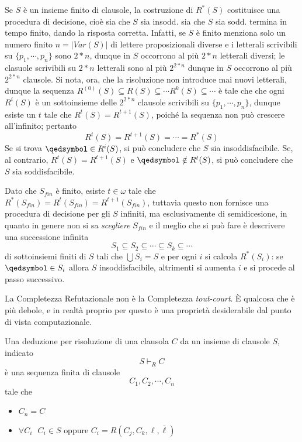 \begin{oss}
        Se $S$ è un insieme finito di clausole, la costruzione di $R^*(S)$ 
        costituisce una procedura di decisione, cioè sia che $S$ sia insodd. 
        sia che $S$ sia sodd. termina in tempo finito, dando la risposta 
        corretta. Infatti, se $S$ è finito menziona solo un numero finito $n = |Var(S)|$ di 
        lettere proposizionali diverse e i letterali scrivibili su $\{p_1, \cdots, p_n\}$ 
        sono $2*n$, dunque in $S$ occorrono al più $2*n$ letterali diversi; le 
        clasuole scrivibili su $2*n$ letterali sono al più $2^{2*n}$ dunque 
        in $S$ occorrono al più $2^{2*n}$ clausole. 
        Si nota, ora, che la risoluzione non introduce mai nuovi letterali, 
        dunque la sequenza $R^{(0)}(S) \subseteq R(S) \subseteq \cdots R^{k}(S) \subseteq \cdots$ 
        è tale che  che ogni $R^{i}(S)$ è un sottoinsieme delle $2^{2*n}$ clausole 
        scrivibili su $\{p_1, \cdots, p_n\}$, dunque esiste un $t$ tale che 
        $R^{t}(S) = R^{t+1}(S)$, poiché la sequenza non può crescere all'infinito; 
        pertanto
        $$
        R^{t}(S) = R^{t+1}(S) = \cdots = R^*(S)
        $$
        Se si trova $\qedsymbol \in R^i(S)$, si può concludere che $S$ sia 
        insoddisfacibile. Se, al contrario, $R^t(S) = R^{t+1}(S)$ e $\qedsymbol \notin R^t(S)$, 
        si può concludere che $S$ sia soddisfacibile. 
\end{oss}
\begin{oss}
        Dato che $S_{fin}$ è finito, esiste $t \in \omega$ tale 
        che $R^*(S_{fin})=R^t(S_{fin}) = R^{t+1}(S_{fin})$, 
        tuttavia questo non fornisce una procedura di decisione per 
        gli $S$ infiniti, ma esclusivamente di semidicesione, in quanto 
        in genere non si sa \textit{scegliere} $S_{fin}$ e 
        il meglio che si può fare è descrivere una successione infinita 
        $$
        S_1 \subseteq S_2 \subseteq \cdots \subseteq S_k  \subseteq \cdots 
        $$
        di sottoinsiemi finiti di $S$ tali che $\bigcup S_i = S$ e 
        per ogni $i$ si calcola $R^*(S_i)$: se $\qedsymbol \in S_i$ allora 
        $S$ insoddisfacibile, 
        altrimenti si aumenta $i$ e si procede al passo successivo.
\end{oss}

La Completezza Refutazionale non è la Completezza \textit{tout-court}. 
\`E qualcosa che è più debole, e in realtà proprio per questo è una 
proprietà desiderabile dal punto di vista computazionale. 

\begin{defi}
        Una deduzione per risoluzione di una clausola $C$ da un insieme di clausole 
        $S$, indicato 
        $$
                S \vdash_R C
        $$
        è una sequenza finita di clausole 
        $$
        C_1,C_2, \cdots, C_n
        $$ 
        tale che 
        \begin{itemize}
                \item $C_n = C$
                \item $\forall C_i ~~~ C_i \in S \text{ oppure } C_i = R(C_j, C_k, \ell, \bar{\ell})$
        \end{itemize}
\end{defi}

